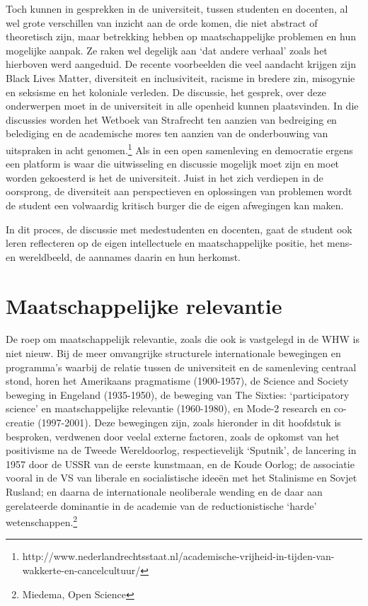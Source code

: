 \documentclass{jote-book}
\begin{document}
	Toch kunnen in gesprekken in de universiteit, tussen studenten en docenten, al wel grote verschillen van inzicht aan de orde komen, die niet abstract of theoretisch zijn, maar betrekking hebben op maatschappelijke problemen en hun mogelijke aanpak. Ze raken wel degelijk aan ‘dat andere verhaal' zoals het hierboven werd aangeduid. De recente voorbeelden die veel aandacht krijgen zijn Black Lives Matter, diversiteit en inclusiviteit, racisme in bredere zin, misogynie en seksisme en het koloniale verleden. De discussie, het gesprek, over deze onderwerpen moet in de universiteit in alle openheid kunnen plaatsvinden. In die discussies worden het Wetboek van Strafrecht ten aanzien van bedreiging en belediging en de academische mores ten aanzien van de onderbouwing van uitspraken in acht genomen.\footnote{http://www.nederlandrechtsstaat.nl/academische-vrijheid-in-tijden-van-wakkerte-en-cancelcultuur/} Als in een open samenleving en democratie ergens een platform is waar die uitwisseling en discussie mogelijk moet zijn en moet worden gekoesterd is het de universiteit. Juist in het zich verdiepen in de oorsprong, de diversiteit aan perspectieven en oplossingen van problemen wordt de student een volwaardig kritisch burger die de eigen afwegingen kan maken.



	In dit proces, de discussie met medestudenten en docenten, gaat de student ook leren reflecteren op de eigen intellectuele en maatschappelijke positie, het mens- en wereldbeeld, de aannames daarin en hun herkomst.



	\section{Maatschappelijke relevantie}



	De roep om maatschappelijk relevantie, zoals die ook is vastgelegd in de WHW is niet nieuw. Bij de meer omvangrijke structurele internationale bewegingen en programma's waarbij de relatie tussen de universiteit en de samenleving centraal stond, horen het Amerikaans pragmatisme (1900-1957), de Science and Society beweging in Engeland (1935-1950), de beweging van The Sixties: ‘participatory science' en maatschappelijke relevantie (1960-1980), en Mode-2 research en co-creatie (1997-2001). Deze bewegingen zijn, zoals hieronder in dit hoofdstuk is besproken, verdwenen door veelal externe factoren, zoals de opkomst van het positivisme na de Tweede Wereldoorlog, respectievelijk ‘Sputnik', de lancering in 1957 door de USSR van de eerste kunstmaan, en de Koude Oorlog; de associatie vooral in de VS van liberale en socialistische ideeën met het Stalinisme en Sovjet Rusland; en daarna de internationale neoliberale wending en de daar aan gerelateerde dominantie in de academie van de reductionistische ‘harde' wetenschappen.\footnote{Miedema, Open Science}
\end{document}
